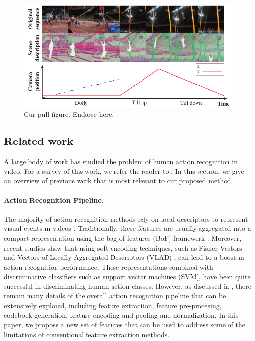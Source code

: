 \begin{figure}[ht]
\begin{center}
\includegraphics[width=0.98\linewidth]{fig/PullFigure.pdf}
\end{center}
\caption{Our pull figure. Endorse here. }
\label{fig:pull_figure}
\end{figure}



\subsection*{Related work}\label{subsec: related work}
A large body of work has studied the problem of human action recognition in video. For a survey of this work, we refer the reader to \cite{aggarwal2011}. In this section, we give an overview of previous work that is most relevant to our proposed method.


\paragraph{\textbf{Action Recognition Pipeline.}}The majority of action recognition methods rely on local descriptors to represent visual events in videos \cite{laptev2005,dollar2005,wang2011}. Traditionally, these features are usually aggregated into a compact representation using the bag-of-features (BoF) framework \cite{laptev2008}. Moreover, recent studies show that using soft encoding techniques, such as  Fisher Vectors \cite{perronnin2010} and Vectors of Locally Aggregated Descriptors (VLAD) \cite{jegou2012}, can lead to a boost in action recognition performance. These representations combined with discriminative classifiers such as support vector machines (SVM), have been quite successful in discriminating human action classes. However, as discussed in \cite{xwang2013}, there remain many details of the overall action recognition pipeline that can be extensively explored, including feature extraction, feature pre-procesing, codebook generation, feature encoding and pooling and normalization. In this paper, we propose a new set of features that can be used to address some of the limitations of conventional feature extraction methods.

